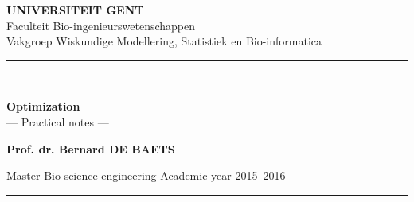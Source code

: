 \begin{titlepage}
	\begin{center}
		{\Large\bf UNIVERSITEIT GENT}\\[.5cm]
		{\Large Faculteit Bio-ingenieurswetenschappen}\\[.5cm]
		{\Large Vakgroep Wiskundige Modellering, Statistiek en Bio-informatica}\\[.5cm]
		\hrule{\ }\\[.4cm]
	
		\vspace{4cm}
\begin{mdframed}[style=warning]
		\vspace{1cm}
\centering
		{{\Huge \bf Optimization}}\\[1cm]
		{\LARGE --- Practical notes ---}
		\vspace{1cm}
\end{mdframed}
		\vspace{3cm}


	\end{center}
	
	\begin{center}
		{\large \bf Prof. dr. Bernard DE BAETS\\[.5cm]
		}%
		
		\vfill
		Master Bio-science engineering\hfill
		Academic year 2015--2016\\[.3cm]
		\hrule \vspace{.3cm}
	\end{center}
\end{titlepage}